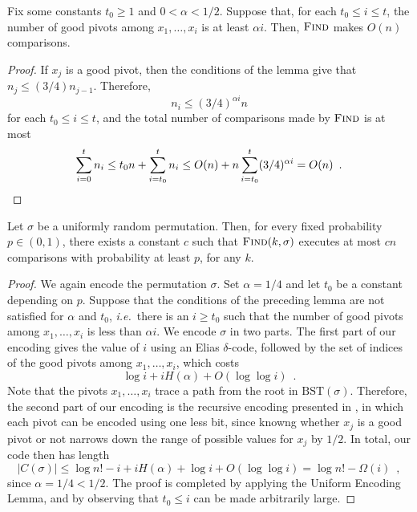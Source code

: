 \documentclass{patmorin}
\newcommand{\aremark}[3]{\textcolor{blue}{\textsc{#1 #2:}}
  \textcolor{red}{\textsf{#3}}}
\newcommand{\wolfgang}[2][says]{\aremark{Wolfgang}{#1}{#2}}
\begin{document}
\begin{lem}
  Fix some constants $t_0 \geq 1$ and $0 < \alpha < 1/2$. Suppose
  that, for each $t_0 \leq i \leq t$, the number of good pivots among
  $x_1, \ldots, x_i$ is at least $\alpha i$. Then, $\textsc{Find}$
  makes $O(n)$ comparisons.
\end{lem}
\begin{proof}
  If $x_j$ is a good pivot, then the conditions of the lemma give
  that $n_j \le (3/4) n_{j - 1}$. Therefore,
  \[
  n_i \leq (3/4)^{\alpha i} n
  \]
  for each $t_0 \leq i \leq t$, and the total number of comparisons
  made by $\textsc{Find}$ is at most 
  \[
    \sum_{i=0}^t n_i \le t_0 n + \sum_{i=t_0}^t n_i \le O(n) + n
    \sum_{i = t_0}^t (3/4)^{\alpha i} = O(n) \enspace . \qedhere
  \]
\end{proof}

\begin{thm}
  Let $\sigma$ be a uniformly random permutation. Then, for 
  every fixed probability $p \in (0,1)$, there exists
  a constant $c$ such that 
  $\textsc{Find}(k, \sigma)$ executes at most $cn$ comparisons with 
  probability at least $p$, for any $k$.
\end{thm}
\begin{proof}
  We again encode the permutation $\sigma$. Set $\alpha = 1/4$ and
  let $t_0$ be a constant depending on $p$. Suppose that the
  conditions of the preceding lemma are not satisfied for $\alpha$ and 
  $t_0$,
  \emph{i.e.}~there is an $i \geq t_0$ such that the number of good pivots
  among $x_1, \dots, x_i$ is less than $\alpha i$. We encode $\sigma$
  in two parts. The first part of our encoding gives the value of $i$
  using an Elias $\delta$-code, followed by the set of indices of the
  good pivots among $x_1, \dots, x_i$, which costs
  \[
  \log i + i H(\alpha) + O(\log \log i) \enspace .
  \]
  Note that the pivots $x_1, \dots, x_i$ trace a path from the root in
  $\text{BST}(\sigma)$. Therefore, the second part of our encoding is
  the recursive encoding presented in , in which each
  pivot can be encoded using one less bit, since
  knowng whether $x_j$ is a good pivot or not narrows down
  the range of possible values for $x_j$ by $1/2$. In total, our code 
  then has length
  \[
    |C(\sigma)| \le \log n! - i + i H(\alpha) + \log i + O(\log \log
    i) = \log n! - \varOmega(i) \enspace ,
  \]
  since $\alpha = 1/4 < 1/2$. The proof is completed by applying 
  the Uniform
  Encoding Lemma, and by observing that $t_0 \leq i$ can be made
  arbitrarily large.
\end{proof}
\end{document}
